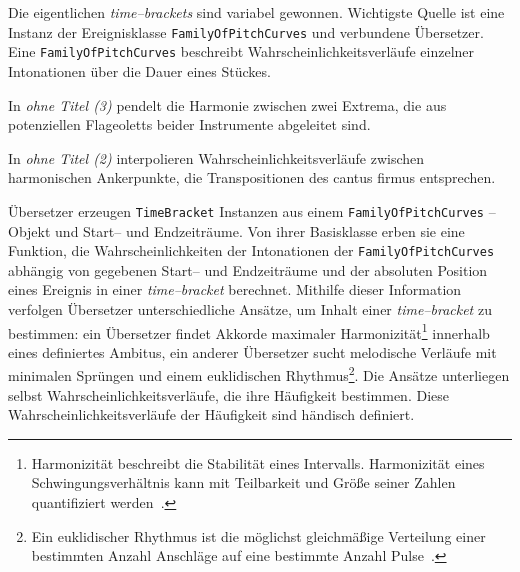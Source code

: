 \documentclass[12pt,a4paper,ngerman]{article}
\begin{document}
\bigskip

Die eigentlichen \emph{time--brackets} sind variabel gewonnen.
Wichtigste Quelle ist eine Instanz der Ereignisklasse \texttt{FamilyOfPitchCurves} und verbundene Übersetzer.
Eine \texttt{FamilyOfPitchCurves} beschreibt Wahrscheinlichkeitsverläufe einzelner Intonationen über die Dauer eines Stückes.

\smallskip

In \emph{ohne Titel (3)} pendelt die Harmonie zwischen zwei Extrema, die aus potenziellen Flageoletts beider Instrumente abgeleitet sind.

\smallskip

In \emph{ohne Titel (2)} interpolieren Wahrscheinlichkeitsverläufe zwischen harmonischen Ankerpunkte, die Transpositionen des cantus firmus entsprechen.

\smallskip

Übersetzer erzeugen \texttt{TimeBracket} Instanzen aus einem \texttt{FamilyOfPitchCurves} -- Objekt und Start-- und Endzeiträume.
Von ihrer Basisklasse erben sie eine Funktion, die Wahrscheinlichkeiten der Intonationen der \texttt{FamilyOfPitchCurves} abhängig von gegebenen Start-- und Endzeiträume und der absoluten Position eines Ereignis in einer \emph{time--bracket} berechnet.
Mithilfe dieser Information verfolgen Übersetzer unterschiedliche Ansätze, um Inhalt einer \emph{time--bracket} zu bestimmen:
ein Übersetzer findet Akkorde maximaler Harmonizität\footnote{%
    Harmonizität beschreibt die Stabilität eines Intervalls.
    Harmonizität eines Schwingungsverhältnis kann mit Teilbarkeit und Größe seiner Zahlen quantifiziert werden~\parencite[S. 5f]{barlowHarmonicity}.
} innerhalb eines definiertes Ambitus,
ein anderer Übersetzer sucht melodische Verläufe mit minimalen Sprüngen und einem euklidischen Rhythmus\footnote{%
    Ein euklidischer Rhythmus ist die möglichst gleichmäßige Verteilung einer bestimmten Anzahl Anschläge auf eine bestimmte Anzahl Pulse~\parencite{toussaintEuclidean}.
}.
Die Ansätze unterliegen selbst Wahrscheinlichkeitsverläufe, die ihre Häufigkeit bestimmen.
Diese Wahrscheinlichkeitsverläufe der Häufigkeit sind händisch definiert.
\end{document}
